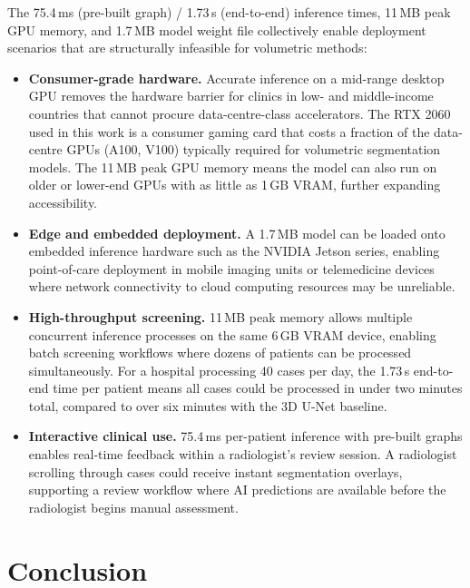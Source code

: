 \documentclass{article}
\begin{document}
The 75.4\,ms (pre-built graph) / 1.73\,s (end-to-end) inference times, 11\,MB peak
GPU memory, and 1.7\,MB model weight file collectively enable deployment scenarios
that are structurally infeasible for volumetric methods:
\begin{itemize}
    \item \textbf{Consumer-grade hardware.} Accurate inference on a mid-range
    desktop GPU removes the hardware barrier for clinics in low- and middle-income
    countries that cannot procure data-centre-class accelerators. The RTX 2060 used
    in this work is a consumer gaming card that costs a fraction of the data-centre
    GPUs (A100, V100) typically required for volumetric segmentation models. The
    11\,MB peak GPU memory means the model can also run on older or lower-end GPUs
    with as little as 1\,GB VRAM, further expanding accessibility.
    \item \textbf{Edge and embedded deployment.} A 1.7\,MB model can be loaded onto
    embedded inference hardware such as the NVIDIA Jetson series, enabling
    point-of-care deployment in mobile imaging units or telemedicine devices where
    network connectivity to cloud computing resources may be unreliable.
    \item \textbf{High-throughput screening.} 11\,MB peak memory allows multiple
    concurrent inference processes on the same 6\,GB VRAM device, enabling batch
    screening workflows where dozens of patients can be processed simultaneously.
    For a hospital processing 40 cases per day, the 1.73\,s end-to-end time per
    patient means all cases could be processed in under two minutes total, compared
    to over six minutes with the 3D U-Net baseline.
    \item \textbf{Interactive clinical use.} 75.4\,ms per-patient inference with
    pre-built graphs enables real-time feedback within a radiologist's review session.
    A radiologist scrolling through cases could receive instant segmentation overlays,
    supporting a review workflow where AI predictions are available before the
    radiologist begins manual assessment.
\end{itemize}

\section{Conclusion}
\label{sec:conclusion}
\end{document}
